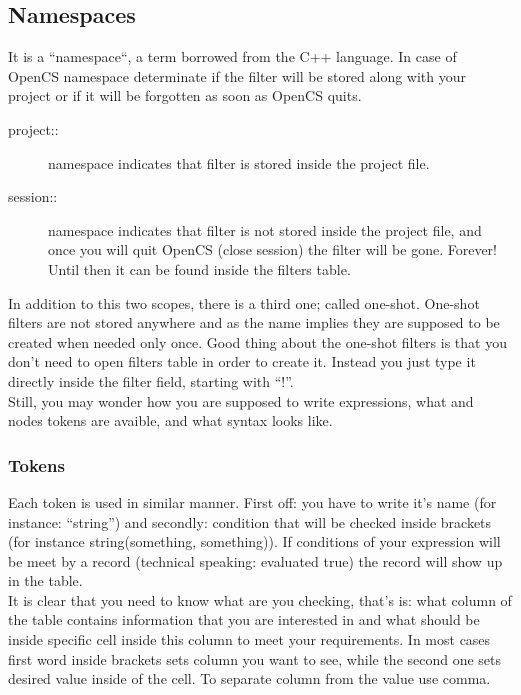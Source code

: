 \subsection{Namespaces}
It is a ``namespace``, a term borrowed from the C++ language. In case of OpenCS namespace determinate if the filter will be stored along with your project or if it will be forgotten as soon as OpenCS quits.
\begin{description}
 \item[project::] namespace indicates that filter is stored inside the project file.
 \item[session::] namespace indicates that filter is not stored inside the project file, and once you will quit OpenCS (close session) the filter will be gone. Forever! Until then it can be found inside the filters table.
\end{description}
In addition to this two scopes, there is a third one; called one-shot. One-shot filters are not stored anywhere and as the name implies they are supposed to be created when needed only once. Good thing about the one-shot filters is that you don't need to open filters table in order to create it. Instead you just type it directly inside the filter field, starting with ``!''.\\
Still, you may wonder how you are supposed to write expressions, what and nodes tokens are avaible, and what syntax looks like.

\subsubsection{Tokens}
Each token is used in similar manner. First off: you have to write it's name (for instance: ``string'') and secondly: condition that will be checked inside brackets (for instance string(something, something)). If conditions of your expression will be meet by a record (technical speaking: evaluated true) the record will show up in the table.\\
It is clear that you need to know what are you checking, that's is: what column of the table contains information that you are interested in and what should be inside specific cell inside this column to meet your requirements. In most cases first word inside brackets sets column you want to see, while the second one sets desired value inside of the cell. To separate column from the value use comma.  


